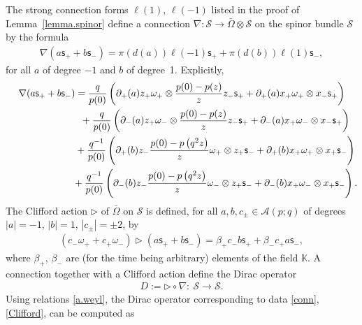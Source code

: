 \documentclass[pdftex]{sigma}
\numberwithin{equation}{section}
\def\AWeyl#1#2{{\mathcal{A}}(#1;#2)}
\begin{document}
The strong connection forms $\ell(1)$, $\ell(-1)$ listed in the proof of Lemma~\ref{lemma.spinor} def\/ine a connection $\nabla\colon \mathcal{S} \to \bar\Omega \otimes \mathcal{S}$ on the spinor bundle $\mathcal{S}$ by the formula
\begin{gather*}
\nabla(a {\mathsf{s}}_+ + b {\mathsf{s}}_-) = \pi(d(a))\ell(-1) {\mathsf{s}}_+ + \pi(d(b))\ell(1) {\mathsf{s}}_-,
\end{gather*}
for all $a$ of degree $-1$ and $b$ of degree~1. Explicitly,
\begin{gather}
\nabla(a {\mathsf{s}}_+ + b {\mathsf{s}}_-) = \frac{q}{p(0)} \left(\partial_+(a){z_+}\omega_+ \otimes \frac{p(0) - p(z)}{z} z_-{\mathsf{s}}_+ + \partial_+(a)x_+\omega_+\otimes x_-{\mathsf{s}}_+ \right)\nonumber \\
\hphantom{\nabla(a {\mathsf{s}}_+ + b {\mathsf{s}}_-) =}{} + \frac{q}{p(0)} \left(\partial_-(a){z_+}\omega_- \otimes \frac{p(0) - p(z)}{z} z_-{\mathsf{s}}_+ + \partial_-(a)x_+\omega_-\otimes x_-{\mathsf{s}}_+ \right)\nonumber \\
 \hphantom{\nabla(a {\mathsf{s}}_+ + b {\mathsf{s}}_-) =}{}+ \frac{q^{-1}}{p(0)} \left(\partial_+(b){z_-}\frac{p(0) - p\left(q^2z\right)}{z} \omega_+ \otimes z_+{\mathsf{s}}_- + \partial_+(b)x_+\omega_+\otimes x_+{\mathsf{s}}_- \right)\nonumber \\
\hphantom{\nabla(a {\mathsf{s}}_+ + b {\mathsf{s}}_-) =}{} + \frac{q^{-1}}{p(0)} \left(\partial_-(b){z_-}\frac{p(0) - p\left(q^2z\right)}{z} \omega_- \otimes z_+{\mathsf{s}}_- + \partial_-(b)x_+\omega_-\otimes x_+{\mathsf{s}}_- \right) .\label{conn}
\end{gather}
The Clif\/ford action $\triangleright$ of $\bar\Omega$ on $\mathcal{S}$ is def\/ined, for all $a,b,c_\pm \in \AWeyl p q$ of degrees $|a| = -1$, $|b| =1$, $|c_\pm| = \pm 2$, by
\begin{gather}\label{Clifford}
(c_-\omega_+ + c_+\omega_-)\triangleright (a {\mathsf{s}}_+ + b {\mathsf{s}}_-) = \beta_+ c_-b {\mathsf{s}}_+ + \beta_- c_+a {\mathsf{s}}_-,
\end{gather}
where $\beta_+$, $\beta_-$ are (for the time being arbitrary) elements of the f\/ield ${\mathbb K}$. A connection together with a Clif\/ford action def\/ine the Dirac operator
\begin{gather*}
D := \triangleright \circ \nabla \colon \ \mathcal{S} \to \mathcal{S}.
\end{gather*}
Using relations \eqref{a.weyl}, the Dirac operator corresponding to data \eqref{conn}, \eqref{Clifford}, can be computed as
\end{document}
